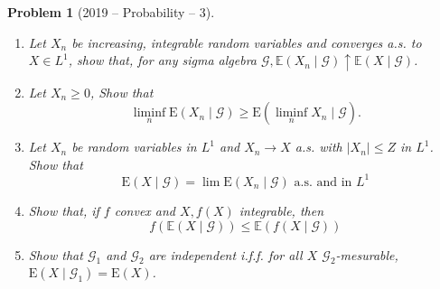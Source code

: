 \documentclass[12pt]{amsart}
\newtheorem{problem}{Problem}
\begin{document}
\begin{problem}[2019 -- Probability -- 3]
\begin{enumerate}[label=\alph*)]
\item Let $X_n$ be increasing, integrable random variables and converges a.s. to $X \in L^1$, show that, for any sigma algebra $\mathcal{G}, \mathbb{E}(X_n \mid \mathcal{G}) \uparrow \mathbb{E}(X \mid \mathcal{G})$.
\item Let $X_n \geq 0$, Show that
$$
\liminf _n \mathrm{E}(X_n \mid \mathcal{G}) \geq \mathrm{E}(\liminf _n X_n \mid \mathcal{G}).
$$
\item Let $X_n$ be random variables in $L^1$ and $X_n \rightarrow X$ a.s. with $|X_n| \leq Z$ in $L^1$. Show that
$$
\mathrm{E}(X \mid \mathcal{G})=\lim \mathrm{E}(X_n \mid \mathcal{G}) \text { a.s. and in } L^1
$$
\item Show that, if $f$ convex and $X, f(X)$ integrable, then
$$
f(\mathbb{E}(X \mid \mathcal{G})) \leq \mathbb{E}(f(X \mid \mathcal{G}))
$$
\item Show that $\mathcal{G}_1$ and $\mathcal{G}_2$ are independent i.f.f. for all $X$ $\mathcal{G}_2$-mesurable, $\mathrm{E}(X \mid \mathcal{G}_1)=\mathrm{E}(X)$.
\end{enumerate}
\end{problem}
\end{document}
